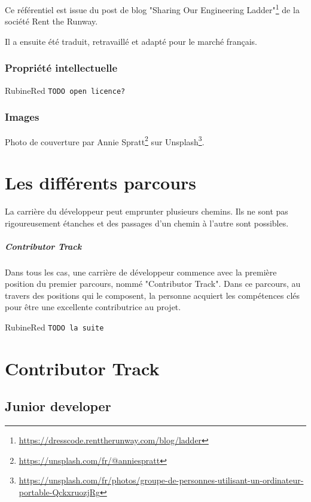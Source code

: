 \documentclass[a4paper, french, openany, 12pt]{book}
\newcommand{\fullwidthimage}[1]{
  \begin{center}
    \makebox[\textwidth]{\texttt{[image: \#1]}}
  \end{center}
}
\newcommand{\todo}[1]{
  \begin{color}{RubineRed}
    \texttt{TODO {#1}}
  \end{color}
}
\begin{document}
Ce référentiel est issue du post de blog 
"Sharing Our Engineering Ladder"\footnote{\url{https://dresscode.renttherunway.com/blog/ladder}}
de la société Rent the Runway.

Il a ensuite été traduit, retravaillé et adapté pour le marché français.

\section*{Propriété intellectuelle}

\todo{open licence?}

\section*{Images}

Photo de couverture par Annie Spratt\footnote{\url{https://unsplash.com/fr/@anniespratt}} sur 
Unsplash\footnote{\url{https://unsplash.com/fr/photos/groupe-de-personnes-utilisant-un-ordinateur-portable-QckxruozjRg}}.

\mainmatter

\part{Les différents parcours}

\fullwidthimage{images/tracks.png}

La carrière du développeur peut emprunter plusieurs chemins.
Ils ne sont pas rigoureusement étanches et des passages d'un chemin à l'autre sont possibles.

\subsubsection*{Contributor Track}

Dans tous les cas, une carrière de développeur commence avec la première position du premier parcours, nommé 
"Contributor Track".
Dans ce parcours, au travers des positions qui le composent, la personne acquiert les compétences clés pour être une
excellente contributrice au projet.

\todo{la suite}

\part{Contributor Track}

\chapter{Junior developer}
\end{document}
